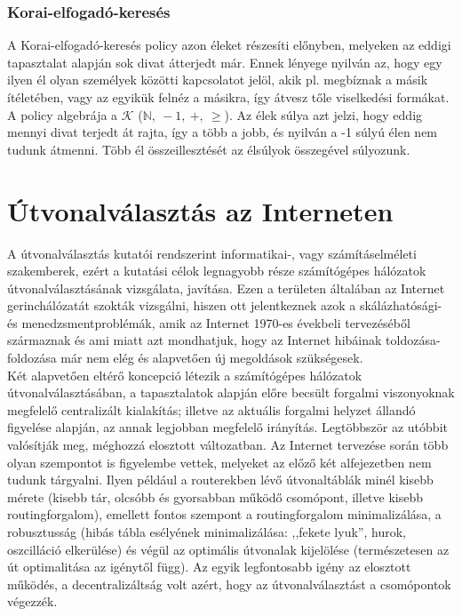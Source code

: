       \subsubsection{Korai-elfogadó-keresés}

      A Korai-elfogadó-keresés policy azon éleket részesíti előnyben, melyeken az eddigi tapasztalat alapján sok divat átterjedt már. Ennek lényege nyilván az, hogy egy ilyen él olyan személyek közötti kapcsolatot jelöl, akik pl. megbíznak a másik ítéletében, vagy az egyikük felnéz a másikra, így átvesz tőle viselkedési formákat. A policy algebrája a $\mathcal{K}$ ($\mathbb{N},~-1,~+,~\geq$). Az élek súlya azt jelzi, hogy eddig mennyi divat terjedt át rajta, így a több a jobb, és nyilván a -1 súlyú élen nem tudunk átmenni. Több él összeillesztését az élsúlyok összegével súlyozunk.\newpage


  \section{Útvonalválasztás az Interneten}

  A útvonalválasztás kutatói rendszerint informatikai-, vagy számításelméleti szakemberek, ezért a kutatási célok legnagyobb része számítógépes hálózatok útvonalválasztásának vizsgálata, javítása. Ezen a területen általában az Internet gerinchálózatát szokták vizsgálni, hiszen ott jelentkeznek azok a skálázhatósági- és menedzsmentproblémák, amik az Internet 1970-es évekbeli tervezéséből származnak és ami miatt azt mondhatjuk, hogy az Internet hibáinak toldozása-foldozása már nem elég és alapvetően új megoldások szükségesek.\\

  Két alapvetően eltérő koncepció létezik a számítógépes hálózatok útvonalválasztásában, a tapasztalatok alapján előre becsült forgalmi viszonyoknak megfelelő centralizált kialakítás; illetve az aktuális forgalmi helyzet állandó figyelése alapján, az annak legjobban megfelelő irányítás. Legtöbbször az utóbbit valósítják meg, méghozzá elosztott változatban. Az Internet tervezése során több olyan szempontot is figyelembe vettek, melyeket az előző két alfejezetben nem tudunk tárgyalni. Ilyen például a routerekben lévő útvonaltáblák minél kisebb mérete (kisebb tár, olcsóbb és gyorsabban működő csomópont, illetve kisebb routingforgalom), emellett fontos szempont a routingforgalom minimalizálása, a robusztusság (hibás tábla esélyének minimalizálása: ,,fekete lyuk'', hurok, oszcilláció elkerülése) és végül az optimális útvonalak kijelölése (természetesen az út optimalitása az igénytől függ). Az egyik legfontosabb igény az elosztott működés, a decentralizáltság volt azért, hogy az útvonalválasztást a csomópontok végezzék.\\

